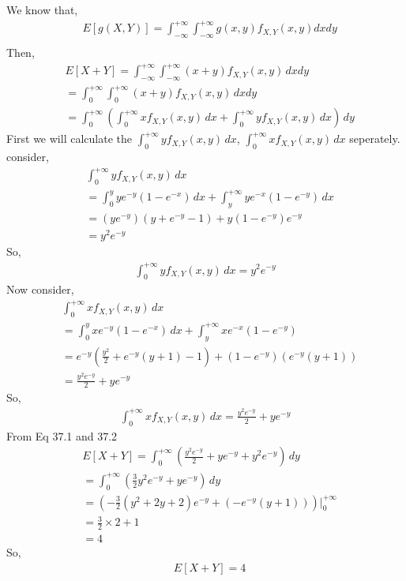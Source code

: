 \documentclass[journal,12pt,twocolumn]{IEEEtran}
\begin{document}
We know that,
\begin{align*}
    &E[g(X,Y)]=\int_{-\infty}^{+\infty}\int_{-\infty}^{+\infty}g(x,y)f_{X,Y}(x,y)dxdy\\
\end{align*}
Then,
\begin{align*}
    &E[X+Y]=\int_{-\infty}^{+\infty}\int_{-\infty}^{+\infty}(x+y)f_{X,Y}(x,y)\,dxdy\\
    &=\int_{0}^{+\infty}\int_{0}^{+\infty}(x+y)f_{X,Y}(x,y)\,dxdy\\
    &=\int_{0}^{+\infty}\left(\int_{0}^{+\infty}xf_{X,Y}(x,y)\,dx+\int_{0}^{+\infty}yf_{X,Y}(x,y)\,dx\right)\,dy
\end{align*}
First we will calculate the $\int_{0}^{+\infty}yf_{X,Y}(x,y)\,dx$,  $\int_{0}^{+\infty}xf_{X,Y}(x,y)\,dx$ seperately.\\
consider,
\begin{align*}
    &\int_{0}^{+\infty}yf_{X,Y}(x,y)\,dx\\
    &=\int_{0}^{y}ye^{-y}(1-e^{-x})\,dx+\int_{y}^{+\infty}ye^{-x}(1-e^{-y})\,dx\\
    &=(ye^{-y})(y+e^{-y}-1)+y(1-e^{-y})e^{-y}\\
    &=y^2e^{-y}
\end{align*}
So,
\begin{align}
    \tag{37.1}
    \int_{0}^{+\infty}yf_{X,Y}(x,y)\,dx=y^2e^{-y}
\end{align}
Now consider,
\begin{align*}
  &\int_{0}^{+\infty}xf_{X,Y}(x,y)\,dx\\
  &=\int_{0}^{y}xe^{-y}(1-e^{-x})\,dx+\int_{y}^{+\infty}xe^{-x}(1-e^{-y})\\
  &=e^{-y}\left(\frac{y^2}{2}+e^{-y}(y+1)-1\right)+(1-e^{-y})(e^{-y}(y+1))\\
  &=\frac{y^2e^{-y}}{2}+ye^{-y}
\end{align*}
So,
\begin{align}
    \tag{37.2}
    \int_{0}^{+\infty}xf_{X,Y}(x,y)\,dx=\frac{y^2e^{-y}}{2}+ye^{-y}
\end{align}
From Eq 37.1 and 37.2
\begin{align*}
    &E[X+Y]=\int_{0}^{+\infty}\left(\frac{y^2e^{-y}}{2}+ye^{-y}+y^2e^{-y}\right)\,dy\\
    &=\int_{0}^{+\infty}\left(\frac{3}{2}y^2e^{-y}+ye^{-y}\right)\,dy\\
    &=\left(-\frac{3}{2}(y^2+2y+2)e^{-y}+(-e^{-y}(y+1))\right)\Biggr|_{0}^{+\infty}\\
    &=\frac{3}{2}\times2+1\\
    &=4
\end{align*}
So,
\begin{align*}
  &E[X+Y]=4
\end{align*}
\end{document}
